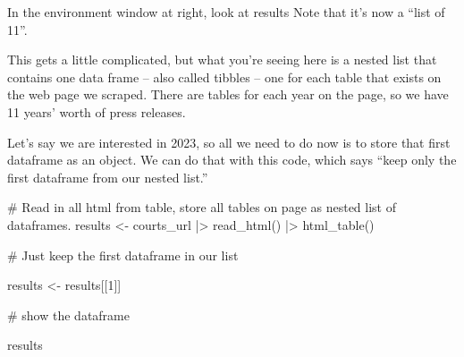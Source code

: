 \documentclass[
  letterpaper,
  DIV=11,
  numbers=noendperiod]{scrreprt}
\newenvironment{Shaded}{\begin{snugshade}}{\end{snugshade}}
\newcommand{\CommentTok}[1]{\textcolor[rgb]{0.37,0.37,0.37}{#1}}
\newcommand{\DecValTok}[1]{\textcolor[rgb]{0.68,0.00,0.00}{#1}}
\newcommand{\FunctionTok}[1]{\textcolor[rgb]{0.28,0.35,0.67}{#1}}
\newcommand{\NormalTok}[1]{\textcolor[rgb]{0.00,0.23,0.31}{#1}}
\newcommand{\OtherTok}[1]{\textcolor[rgb]{0.00,0.23,0.31}{#1}}
\newcommand{\SpecialCharTok}[1]{\textcolor[rgb]{0.37,0.37,0.37}{#1}}
\begin{document}
In the environment window at right, look at results Note that it's now a
``list of 11''.

This gets a little complicated, but what you're seeing here is a nested
list that contains one data frame -- also called tibbles -- one for each
table that exists on the web page we scraped. There are tables for each
year on the page, so we have 11 years' worth of press releases.

Let's say we are interested in 2023, so all we need to do now is to
store that first dataframe as an object. We can do that with this code,
which says ``keep only the first dataframe from our nested list.''

\begin{Shaded}
\begin{Highlighting}[]
\CommentTok{\# Read in all html from table, store all tables on page as nested list of dataframes.}
\NormalTok{results }\OtherTok{\textless{}{-}}\NormalTok{ courts\_url }\SpecialCharTok{|\textgreater{}}
  \FunctionTok{read\_html}\NormalTok{() }\SpecialCharTok{|\textgreater{}}
  \FunctionTok{html\_table}\NormalTok{()}

\CommentTok{\# Just keep the first dataframe in our list}

\NormalTok{results }\OtherTok{\textless{}{-}}\NormalTok{ results[[}\DecValTok{1}\NormalTok{]]}

\CommentTok{\# show the dataframe}

\NormalTok{results}
\end{Highlighting}
\end{Shaded}
\end{document}
